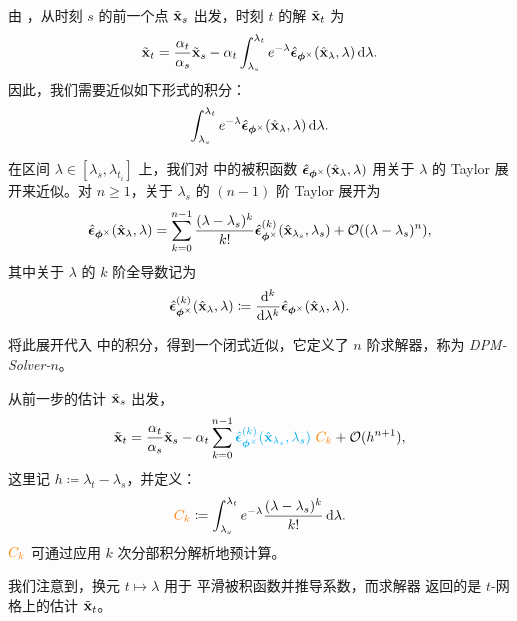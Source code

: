 由 ，从时刻 $s$ 的前一个点 $\tilde{{\mathbf{x}}}_{s}$ 出发，时刻 $t$ 的解 $\tilde{{\mathbf{x}}}_{t} $ 为
\begin{equation}
\label{eqn:analytic_solution_each_step}
    \tilde{{\mathbf{x}}}_{t}  = \frac{\alpha_{t}}{\alpha_{s}} \tilde{{\mathbf{x}}}_{s} - \alpha_{t} \int_{\lambda_{s}}^{\lambda_{t}} e^{-\lambda} \hat{\bm{\epsilon}}_{\bm{\phi}^\times}(\hat{{\mathbf{x}}}_{\lambda}, \lambda)\mathop{}\!\mathrm{d}\lambda.
\end{equation}
因此，我们需要近似如下形式的积分：
\begin{align*}
    \int_{\lambda_{s}}^{\lambda_{t}} e^{-\lambda} \hat{\bm{\epsilon}}_{\bm{\phi}^\times}(\hat{{\mathbf{x}}}_{\lambda}, \lambda)\mathop{}\!\mathrm{d}\lambda.
\end{align*}

在区间 $\lambda \in [\lambda_{s}, \lambda_{t_i}]$ 上，我们对  中的被积函数 $\hat{\bm{\epsilon}}_{\bm{\phi}^\times}(\hat{{\mathbf{x}}}_\lambda, \lambda)$ 用关于 $\lambda$ 的 Taylor 展开来近似。对 $n \geq 1$，关于 $\lambda_{s}$ 的 $(n{-}1)$ 阶 Taylor 展开为
\begin{equation*}
    \hat{\bm{\epsilon}}_{\bm{\phi}^\times}(\hat{{\mathbf{x}}}_\lambda, \lambda)
    = \sum_{k=0}^{n-1} \frac{(\lambda - \lambda_{s})^k}{k!} 
    \hat{\bm{\epsilon}}_{\bm{\phi}^\times}^{(k)}(\hat{{\mathbf{x}}}_{\lambda_{s}}, \lambda_{s})
    + \mathcal{O}((\lambda - \lambda_{s})^n),
\end{equation*}
其中关于 $\lambda$ 的 $k$ 阶全导数记为
\[
\hat{\bm{\epsilon}}_{\bm{\phi}^\times}^{(k)}(\hat{{\mathbf{x}}}_\lambda, \lambda) 
\coloneqq \frac{\mathop{}\!\mathrm{d}^k}{\mathop{}\!\mathrm{d}\lambda^k} \hat{\bm{\epsilon}}_{\bm{\phi}^\times}(\hat{{\mathbf{x}}}_\lambda, \lambda).
\]

将此展开代入  中的积分，得到一个闭式近似，它定义了 $n$ 阶求解器，称为 \emph{DPM-Solver-$n$}。

\begin{mdframed}
从前一步的估计 $\tilde{{\mathbf{x}}}_{s}$ 出发，
\begin{equation}
    \label{eq:k-th-expansion}
    \tilde{{\mathbf{x}}}_{t}  =  \frac{\alpha_{t}}{\alpha_{s}} \tilde{{\mathbf{x}}}_{s} - \alpha_{t} \sum_{k=0}^{n-1} {\color{cyan}\hat{\bm{\epsilon}}_{\bm{\phi}^\times}^{(k)}(\hat{{\mathbf{x}}}_{\lambda_{s}},\lambda_{s})} ~{\color{orange}C_k}  + \mathcal{O}(h^{n+1}),
\end{equation}
这里记 $h\coloneqq \lambda_{t} - \lambda_{s}$，并定义：
\begin{align*}
    {\color{orange}C_k}\coloneqq\int_{\lambda_{s}}^{\lambda_{t}}   e^{-\lambda}  \frac{(\lambda - \lambda_{s})^k}{k!}\mathop{}\!\mathrm{d}\lambda.
\end{align*}
${\color{orange}C_k}$ 可通过应用 $k$ 次分部积分解析地预计算。
\end{mdframed}
我们注意到，换元 $t \mapsto \lambda$ 用于
平滑被积函数并推导系数，而求解器
返回的是 $t$-网格上的估计 $\tilde{{\mathbf{x}}}_{t}$。

